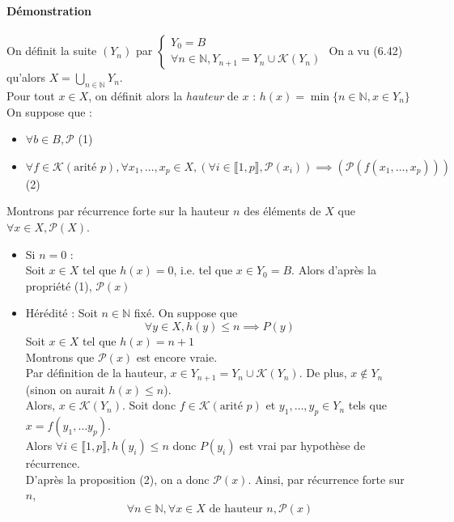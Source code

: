 \documentclass{article}
\newcommand{\notion}[1]{\textcolor{vert_fonce}{\textit{#1}}}
\newenvironment{demonstration}
{
    \begin{boite_demonstration}
    \textbf{\textcolor{rouge_fonce}{Démonstration}}\\ \\
}
{
    \end{boite_demonstration}
    \vspace{15pt}
}
\begin{document}
\begin{adjustwidth}{-3cm}{-3cm}
\begin{demonstration}
    On définit la suite $(Y_n)$ par $\begin{cases}
        Y_0 =  B \\
        \forall n \in \mathbb{N}, Y_{n+1} = Y_n \cup \mathcal{K}(Y_n)
    \end{cases}$
    On a vu (6.42) qu'alors $X = \bigcup_{n \in \mathbb{N}}Y_n$. \\ Pour tout $x \in X$, on définit alors la \notion{hauteur} de $x$ : $h(x) = \min \{n \in \mathbb{N}, x \in Y_n\}$
    On suppose que : \begin{itemize}
        \item $\forall b \in B, \mathcal{P}$ (1)
        \item $\forall f \in \mathcal{K} (\text{arité }p), \forall x_1,\ldots, x_p \in X, (\forall i \in \llbracket 1,p \rrbracket, \mathcal{P}(x_i)) \implies (\mathcal{P}(f(x_1,\ldots,x_p)))$ (2)
    \end{itemize}
    Montrons par récurrence forte sur la hauteur $n$ des éléments de $X$ que $\forall x \in X, \mathcal{P}(X)$.
    \begin{itemize}
        \item Si $n = 0$ : \\Soit $x \in X$ tel que $h(x) = 0$, i.e. tel que $x \in Y_0 = B$. Alors d'après la propriété (1), $\mathcal{P}(x)$
        \item Hérédité : Soit $n \in \mathbb{N}$ fixé. On suppose que $$\forall y \in X, h(y) \leq n \implies P(y)$$ Soit $x \in X$ tel que $h(x) = n+1$ \\ Montrons que $\mathcal{P}(x)$ est encore vraie.\\Par définition de la hauteur, $x \in Y_{n+1} = Y_{n} \cup \mathcal{K}(Y_n)$. De plus, $x \notin Y_n$ (sinon on aurait $h(x) \leq n$).\\Alors, $x \in \mathcal{K}(Y_n)$. Soit donc $f \in \mathcal{K} (\text{arité }p)$ et $y_1, \ldots, y_p \in Y_n$ tels que $x = f(y_1,\ldots y_p)$.\\ Alors $\forall i \in \llbracket 1,p \rrbracket, h(y_i) \leq n$ donc $P(y_i)$ est vrai par hypothèse de récurrence.\\D'après la proposition (2), on a donc $\mathcal{P}(x)$. Ainsi, par récurrence forte sur $n$, $$\forall n \in \mathbb{N}, \forall x \in X \text{ de hauteur } n, \mathcal{P}(x)$$
    \end{itemize}
\end{demonstration}


\end{adjustwidth}
\end{document}
